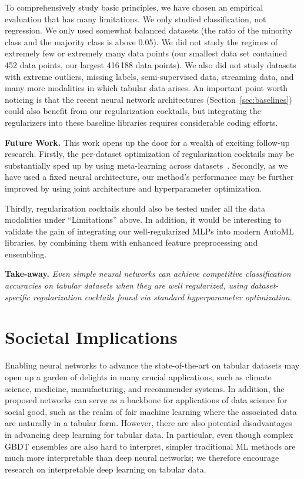 To comprehensively study basic principles, we have chosen an empirical evaluation that has many limitations. We only studied classification, not regression. We only used somewhat balanced datasets (the ratio of the minority class and the majority class is above 0.05). We did not study the regimes of extremely few or extremely many data points (our smallest data set contained 452 data points, our largest 416\,188 data points). We also did not study datasets with extreme outliers, missing labels, semi-supervised data, streaming data, and many more modalities in which tabular data arises. An important point worth noticing is that the recent neural network architectures (Section~\ref{sec:baselines}) could also benefit from our regularization cocktails, but integrating the regularizers into these baseline libraries requires considerable coding efforts.

\textbf{Future Work.} This work opens up the door for a wealth of exciting follow-up research. Firstly, the per-dataset optimization of regularization cocktails may be substantially sped up by using meta-learning across datasets~\cite{metalearning_vanschoren}. Secondly, as we have used a fixed neural architecture, our method's performance may be further improved by using joint architecture and hyperparameter optimization.

Thirdly, regularization cocktails should also be tested under all the data modalities under ``Limitations'' above. In addition, it would be interesting to validate the gain of integrating our well-regularized MLPs into modern AutoML libraries, by combining them with enhanced feature preprocessing and ensembling.

\textbf{Take-away.}
\emph{Even simple neural networks can achieve competitive classification accuracies on tabular datasets when they are well regularized, using dataset-specific regularization cocktails found via standard hyperparameter optimization.}

\section*{Societal Implications} 
\label{societal_implications}

Enabling neural networks to advance the state-of-the-art on tabular datasets may open up a garden of delights in many crucial applications, such as climate science, medicine, manufacturing, and recommender systems. In addition, the proposed networks can serve as a backbone for applications of data science for social good, such as the realm of fair machine learning where the associated data are naturally in a tabular form. However, there are also potential disadvantages in advancing deep learning for tabular data. In particular, even though complex GBDT ensembles are also hard to interpret, simpler traditional ML methods are much more interpretable than deep neural networks; we therefore encourage research on interpretable deep learning on tabular data.


